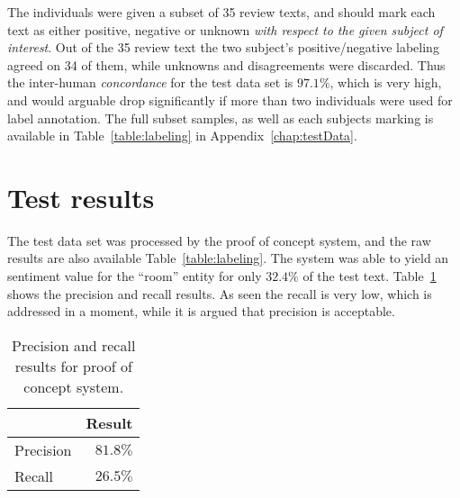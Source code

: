 The individuals were given a subset of 35 review texts, and should mark each text as either positive, negative or unknown \emph{with respect to the given subject of interest}. Out of the 35 review text the two subject's positive/negative labeling agreed on 34 of them, while unknowns and disagreements were discarded. Thus the inter-human \emph{concordance} for the test data set is $97.1\%$, which is very high, and would arguable drop significantly if more than two individuals were used for label annotation. The full subset samples, as well as each subjects marking is available in Table~\ref{table:labeling} in Appendix~\ref{chap:testData}.

\section{Test results}
The test data set was processed by the proof of concept system, and the raw results are also available Table~\ref{table:labeling}. The system was able to yield an sentiment value for the ``room'' entity for only $32.4\%$ of the test text. Table~\ref{table:results} shows the precision and recall results. As seen the recall is very low, which is addressed in a moment, while it is argued that precision is acceptable. 

\begin{table}[ht]
\center
\begin{tabular}{l|r}
	          & Result \\ \hline
	Precision & $81.8\%$ \\
	Recall    & $26.5\%$ 
\end{tabular}
\caption{Precision and recall results for proof of concept system.}
\label{table:results}
\end{table}